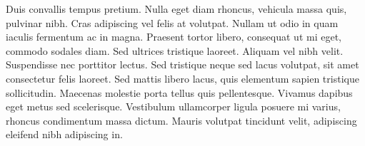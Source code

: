 Duis convallis tempus pretium. Nulla eget diam rhoncus, vehicula massa quis, pulvinar nibh. Cras adipiscing vel felis at volutpat. Nullam ut odio in quam iaculis fermentum ac in magna. Praesent tortor libero, consequat ut mi eget, commodo sodales diam. Sed ultrices tristique laoreet. Aliquam vel nibh velit. Suspendisse nec porttitor lectus. Sed tristique neque sed lacus volutpat, sit amet consectetur felis laoreet. Sed mattis libero lacus, quis elementum sapien tristique sollicitudin. Maecenas molestie porta tellus quis pellentesque. Vivamus dapibus eget metus sed scelerisque. Vestibulum ullamcorper ligula posuere mi varius, rhoncus condimentum massa dictum. Mauris volutpat tincidunt velit, adipiscing eleifend nibh adipiscing in.
